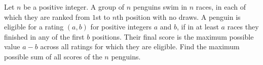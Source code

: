 Let $n$ be a positive integer.
A group of $n$ penguins swim in $n$ races,
in each of which they are ranked from $1$st to $n$th position with no draws.
A penguin is eligible for a rating $(a,b)$ for positive integers $a$ and $b$,
if in at least $a$ races they finished in any of the first $b$ positions.
Their final score is the maximum possible value $a-b$ across all ratings for which they are eligible.
Find the maximum possible sum of all scores of the $n$ penguins.
